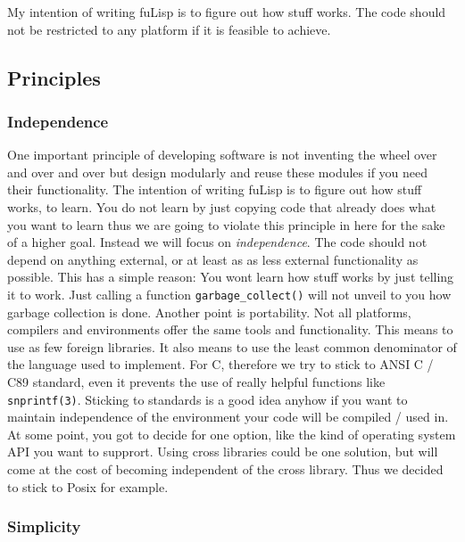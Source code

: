 My intention of writing fuLisp is to figure out how stuff works.
The code should not be restricted to any platform if it is feasible to achieve.

\subsection{Principles}

\subsubsection{Independence}

One important principle of developing software is not inventing the wheel over
and over and over but design modularly and reuse these modules if you need 
their functionality.
The intention of writing fuLisp is to figure out how stuff works, to learn.
You do not learn by just copying code that already does what you want to learn
thus we are going to violate this principle in here for the sake of a higher 
goal.
Instead we will focus on \emph{independence}.
The code should not depend on anything external, or at least as as less
external functionality as possible.
This has a simple reason: You wont learn how stuff works by just telling it to 
work. Just calling a function \texttt{garbage\_collect()} will not unveil to you
how garbage collection is done.
Another point is portability.
Not all platforms, compilers and environments offer the same tools and 
functionality. 
This means to use as few foreign libraries. It also means to use the least 
common denominator of the language used to implement. For C, therefore we try 
to stick to ANSI C / C89 standard, even it prevents the use of really helpful 
functions like \texttt{snprintf(3)}.
Sticking to standards is a good idea anyhow if you want to maintain independence
of the environment your code will be compiled / used in.
At some point, you got to decide for one option, like the kind of operating 
system API you want to supprort. 
Using cross libraries could be one solution, but will come at the cost of 
becoming independent of the cross library.
Thus we decided to stick to Posix for example.

\subsubsection{\label{sec:simplicity}Simplicity}

